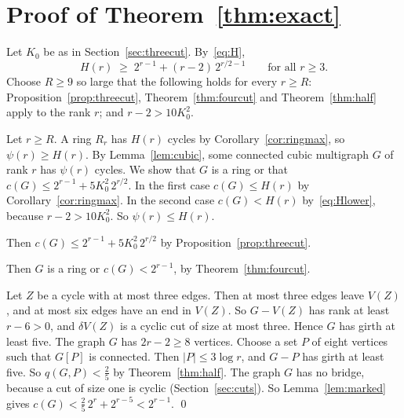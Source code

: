 \section{Proof of Theorem~\ref{thm:exact}}\label{sec:proof}

Let $K_0$ be as in Section~\ref{sec:threecut}. By~\eqref{eq:H},
\begin{equation}\label{eq:Hlower}
  H(r)\;\ge\;2^{r-1}+(r-2)\,2^{r/2-1}\qquad\text{for all }r\ge3 .
\end{equation}
Choose $R\ge9$ so large that the following holds for every $r\ge R$:
Proposition~\ref{prop:threecut}, Theorem~\ref{thm:fourcut} and Theorem~\ref{thm:half} apply to
the rank $r$; and $r-2>10K_0^{2}$.

Let $r\ge R$. A ring $R_r$ has $H(r)$ cycles by Corollary~\ref{cor:ringmax}, so $\psi(r)\ge H(r)$.
By Lemma~\ref{lem:cubic}, some connected cubic multigraph $G$ of rank $r$ has $\psi(r)$ cycles. We
show that $G$ is a ring or that $c(G)\le2^{r-1}+5K_0^{2}\,2^{r/2}$. In the first case
$c(G)\le H(r)$ by Corollary~\ref{cor:ringmax}. In the second case $c(G)<H(r)$ by~\eqref{eq:Hlower},
because $r-2>10K_0^{2}$. So $\psi(r)\le H(r)$.

 Then
$c(G)\le2^{r-1}+5K_0^{2}\,2^{r/2}$ by Proposition~\ref{prop:threecut}.

Then $G$ is a ring or $c(G)<2^{r-1}$, by Theorem~\ref{thm:fourcut}.

 Let $Z$
be a cycle with at most three edges. Then at most three edges leave $V(Z)$, and
at most six edges have an end in $V(Z)$. So $G-V(Z)$ has rank at least $r-6>0$, and
$\delta V(Z)$ is a cyclic cut of size at most three. Hence $G$ has girth at least five. The graph $G$ has $2r-2\ge8$ vertices. Choose a set $P$
of eight vertices such that $G[P]$ is connected. Then $|P|\le3\log r$, and $G-P$ has girth at
least five. So $q(G,P)<\frac25$ by Theorem~\ref{thm:half}.
The graph $G$ has no bridge, because a cut of size one is cyclic (Section~\ref{sec:cuts}). So
Lemma~\ref{lem:marked} gives $c(G)<\frac25\,2^{r}+2^{r-5}<2^{r-1}$. \qed
